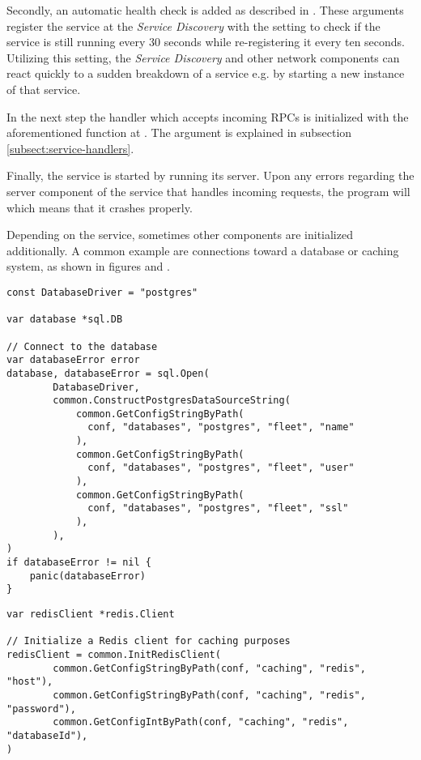 \documentclass[12pt,a4paper,twoside]{report}
\begin{document}
Secondly, an automatic health check is added as described in
. These arguments register the service
at the \textit{Service Discovery} with the setting to check if the service is
still running every 30 seconds while re-registering it every ten seconds.
Utilizing this setting, the \textit{Service Discovery} and other
network components can react quickly to a sudden breakdown of a service e.g.
by starting a new instance of that service.

In the next step the handler which accepts incoming RPCs is initialized with the
aforementioned function at .
The argument  is explained in subsection \ref{subsect:service-handlers}.

Finally, the service is started by running its server. Upon any errors regarding
the server component of the service that handles incoming requests,
the program will  which means that it crashes properly.

Depending on the service, sometimes other components are initialized additionally.
A common example are connections toward a database or caching system,
as shown in figures 
and .

\begin{lstlisting}[title=services/fleet-controller/main.go, float, floatplacement=H]
const DatabaseDriver = "postgres"

var database *sql.DB

// Connect to the database
var databaseError error
database, databaseError = sql.Open(
		DatabaseDriver,
		common.ConstructPostgresDataSourceString(
			common.GetConfigStringByPath(
              conf, "databases", "postgres", "fleet", "name"
            ),
			common.GetConfigStringByPath(
              conf, "databases", "postgres", "fleet", "user"
            ),
			common.GetConfigStringByPath(
              conf, "databases", "postgres", "fleet", "ssl"
            ),
		),
)
if databaseError != nil {
	panic(databaseError)
}
\end{lstlisting}

\begin{lstlisting}[title=services/fleet-monitor/main.go, float, floatplacement=H]
var redisClient *redis.Client

// Initialize a Redis client for caching purposes
redisClient = common.InitRedisClient(
		common.GetConfigStringByPath(conf, "caching", "redis", "host"),
		common.GetConfigStringByPath(conf, "caching", "redis", "password"),
		common.GetConfigIntByPath(conf, "caching", "redis", "databaseId"),
)
\end{lstlisting}
\end{document}
